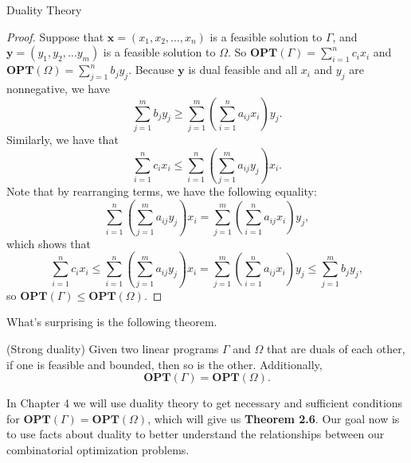 \begin{section}{Duality Theory}
	\begin{proof}
		Suppose that $\mathbf{x} = (x_1, x_2,\dots,x_n)$ is a feasible solution to $\Gamma$, and 
		$\mathbf{y} = (y_1, y_2, \dots y_m)$ is a feasible solution to $\Omega$. 
		So $\mathbf{OPT}(\Gamma) = \sum_{i=1}^{n} c_i x_i$ and 
		$\mathbf{OPT}(\Omega) = \sum_{j=1}^{n} b_j y_j$.
		Because 
		$\mathbf{y}$ is dual feasible and all $x_i$ and $y_j$ are nonnegative, we have 
		\[
			\sum_{j=1}^{m} b_j y_j \geq \sum_{j=1}^{m}\left(\sum_{i=1}^{n} a_{ij}x_i\right) 
			y_j.
		\]
		Similarly, we have that 
		\[
			\sum_{i=1}^{n} c_i x_i \leq \sum_{i=1}^{n}\left(\sum_{j=1}^{m} a_{ij} y_j\right) 
			x_i.
		\]
		Note that by rearranging terms, we have the following equality:
		\[
			\sum_{i=1}^{n}\left(\sum_{j=1}^{m} a_{ij} y_j\right) 
			x_i =
			\sum_{j=1}^{m}\left(\sum_{i=1}^{n} a_{ij}x_i\right) 
			y_j,
		\]
		which shows that 
		\[
			\sum_{i=1}^{n} c_i x_i \leq 
			\sum_{i=1}^{n}\left(\sum_{j=1}^{m} a_{ij} y_j\right) 
			x_i =
			\sum_{j=1}^{m}\left(\sum_{i=1}^{n} a_{ij}x_i\right) 
			y_j \leq 
			\sum_{j=1}^{m} b_j y_j,
		\]
		so $\mathbf{OPT}(\Gamma) \leq \mathbf{OPT}(\Omega)$.
	\end{proof}
	What's surprising is the following theorem.

	\begin{theorem}{(Strong duality)}
		Given two linear programs $\Gamma$ and $\Omega$ that are duals of each other, if one is 
		feasible and bounded, then so is the other. Additionally, 
		\[
			\mathbf{OPT}(\Gamma) = \mathbf{OPT}(\Omega).
		\]
	\end{theorem} 
	In Chapter 4 we will use duality theory to get necessary and sufficient conditions for 
	$\mathbf{OPT}(\Gamma) = \mathbf{OPT}(\Omega)$, which will give us \textbf{Theorem 2.6}.
	Our goal now is to use facts about duality to better understand the relationships between 
	our combinatorial optimization problems.


\end{section}
